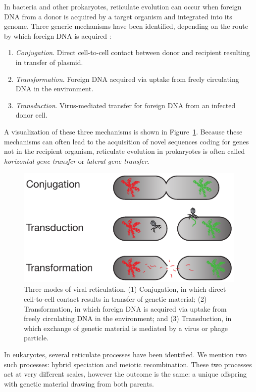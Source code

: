 In bacteria and other prokaryotes, reticulate evolution can occur when foreign DNA from a donor is acquired by a target organism and integrated into its genome.
Three generic mechanisms have been identified, depending on the route by which foreign DNA is acquired \cite{Ochman:2000dr}:
\begin{enumerate}
\item \emph{Conjugation}. Direct cell-to-cell contact between donor and recipient resulting in transfer of plasmid.
\item \emph{Transformation}. Foreign DNA acquired via uptake from freely circulating DNA in the environment.
\item \emph{Transduction}. Virus-mediated transfer for foreign DNA from an infected donor cell.
\end{enumerate}
A visualization of these three mechanisms is shown in Figure~\ref{fig:bacterial_reticulation}.
Because these mechanisms can often lead to the acquisition of novel sequences coding for genes not in the recipient organism, reticulate evolution in prokaryotes is often called \emph{horizontal gene transfer} or \emph{lateral gene transfer}.

\begin{figure}
\centering
\includegraphics[]{./fig/background/bacterial_reticulation.pdf}
\caption[Three modes of bacterial reticulation]{Three modes of viral reticulation. (1) Conjugation, in which direct cell-to-cell contact results in transfer of genetic material; (2) Transformation, in which foreign DNA is acquired via uptake from freely circulating DNA in the environment; and (3) Transduction, in which exchange of genetic material is mediated by a virus or phage particle.}
\label{fig:bacterial_reticulation}
\end{figure}

In eukaryotes, several reticulate processes have been identified.
We mention two such processes: hybrid speciation and meiotic recombination.
These two processes act at very different scales, however the outcome is the same: a unique offspring with genetic material drawing from both parents.

